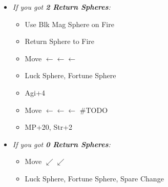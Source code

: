 \begin{spheregrid}
\begin{itemize}
\begin{itemize}
            \item \textit{If you got \textbf{2 Return Spheres}:}
                \begin{itemize}
                    \item Use Blk Mag Sphere on Fire
                    \item Return Sphere to Fire
                    \item Move $\leftarrow\leftarrow\leftarrow$
                    \item Luck Sphere, Fortune Sphere
                    \item Agi+4
                    \item Move $\leftarrow\leftarrow\leftarrow$ #TODO
                    \item MP+20, Str+2
                \end{itemize}
            \item \textit{If you got \textbf{0 Return Spheres}:}
                \begin{itemize}
                    \item Move $\swarrow\swarrow$
                    \item Luck Sphere, Fortune Sphere, Spare Change

\end{itemize}
\end{itemize}
\end{itemize}
\end{spheregrid}
